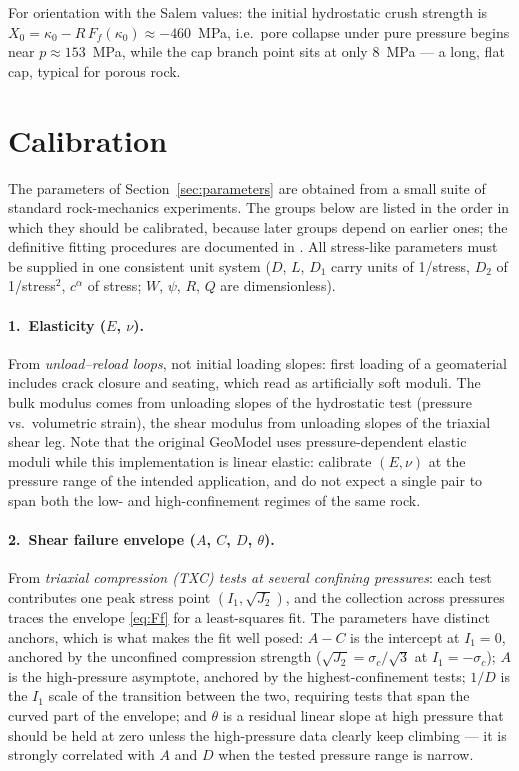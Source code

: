 \documentclass[12pt]{article}
\begin{document}
For orientation with the Salem values: the initial hydrostatic crush
strength is $X_0 = \kappa_0 - R\,F_f(\kappa_0) \approx -460$~MPa,
i.e.\ pore collapse under pure pressure begins near
$p \approx 153$~MPa, while the cap branch point sits at only
$8$~MPa --- a long, flat cap, typical for porous rock.

\section{Calibration}
\label{sec:calibration}

The parameters of Section~\ref{sec:parameters} are obtained from a
small suite of standard rock-mechanics experiments. The groups below
are listed in the order in which they should be calibrated, because
later groups depend on earlier ones; the definitive fitting
procedures are documented in \citet[Section~4]{Fossum.Brannon:2004}.
All stress-like parameters must be supplied in one consistent unit
system ($D$, $L$, $D_1$ carry units of 1/stress, $D_2$ of
1/stress$^2$, $c^\alpha$ of stress; $W$, $\psi$, $R$, $Q$ are
dimensionless).

\paragraph{1.\ Elasticity ($E$, $\nu$).}
From \emph{unload--reload loops}, not initial loading slopes: first
loading of a geomaterial includes crack closure and seating, which
read as artificially soft moduli. The bulk modulus comes from
unloading slopes of the hydrostatic test (pressure vs.\ volumetric
strain), the shear modulus from unloading slopes of the triaxial
shear leg. Note that the original GeoModel uses pressure-dependent
elastic moduli while this implementation is linear elastic: calibrate
$(E,\nu)$ at the pressure range of the intended application, and do
not expect a single pair to span both the low- and high-confinement
regimes of the same rock.

\paragraph{2.\ Shear failure envelope ($A$, $C$, $D$, $\theta$).}
From \emph{triaxial compression (TXC) tests at several confining
pressures}: each test contributes one peak stress point
$(I_1, \sqrt{J_2})$, and the collection across pressures traces the
envelope \eqref{eq:Ff} for a least-squares fit. The parameters have
distinct anchors, which is what makes the fit well posed: $A - C$ is
the intercept at $I_1 = 0$, anchored by the unconfined compression
strength ($\sqrt{J_2} = \sigma_c/\sqrt{3}$ at $I_1 = -\sigma_c$);
$A$ is the high-pressure asymptote, anchored by the
highest-confinement tests; $1/D$ is the $I_1$ scale of the transition
between the two, requiring tests that span the curved part of the
envelope; and $\theta$ is a residual linear slope at high pressure
that should be held at zero unless the high-pressure data clearly
keep climbing --- it is strongly correlated with $A$ and $D$ when the
tested pressure range is narrow.
\end{document}
